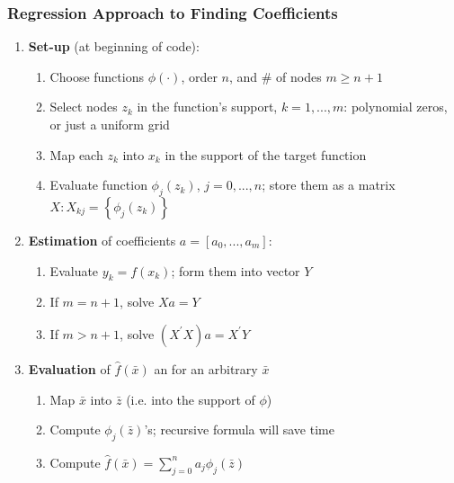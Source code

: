\documentclass[bigger]{beamer}
\begin{document}
\begin{frame}%

\frametitle{Regression Approach to Finding Coefficients}

\begin{enumerate}
\item \textbf{Set-up} (at beginning of code):

\begin{enumerate}
\item Choose functions $\phi \left( \cdot \right) $, order $n$, and \# of
nodes $m\geq n+1$

\item Select nodes $z_{k}$ in the function's support, $k=1,...,m$:\newline
polynomial zeros, or just a uniform grid

\item Map each $z_{k}$ into $x_{k}$ in the support of the target function

\item Evaluate function $\phi _{j}\left( z_{k}\right) $, $j=0,...,n$; 
\newline
store them as a matrix $X:X_{kj}=\left\{ \phi _{j}\left( z_{k}\right)
\right\} $
\end{enumerate}

\item \textbf{Estimation} of coefficients $a=\left[ a_{0},...,a_{m}\right] $:

\begin{enumerate}
\item Evaluate $y_{k}=f\left( x_{k}\right) $; form them into vector $Y$

\item If $m=n+1$, solve $Xa=Y$

\item If $m>n+1$, solve $\left( X^{\prime }X\right) a=X^{\prime }Y$
\end{enumerate}

\item \textbf{Evaluation} of $\hat{f}\left( \bar{x}\right) $ an for an
arbitrary $\bar{x}$

\begin{enumerate}
\item Map $\bar{x}$ into $\bar{z}$ (i.e. into the support of $\phi $)

\item Compute $\phi _{j}\left( \bar{z}\right) $'s; recursive formula will
save time

\item Compute $\hat{f}\left( \bar{x}\right) =\sum_{j=0}^{n}a_{j}\phi
_{j}\left( \bar{z}\right) $
\end{enumerate}
\end{enumerate}


\end{frame}%
\end{document}
